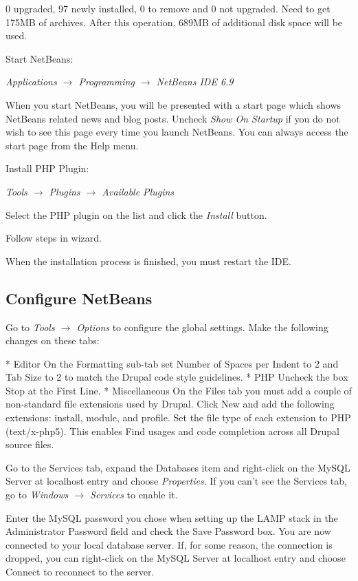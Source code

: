 \documentclass[final,ebook,10pt,twoside,openright]{memoir}
\begin{document}
0 upgraded, 97 newly installed, 0 to remove and 0 not upgraded.
Need to get 175MB of archives.
After this operation, 689MB of additional disk space will be used.

Start NetBeans:

\emph{Applications $\rightarrow$ Programming $\rightarrow$ NetBeans IDE 6.9}

When you start NetBeans, you will be presented with a start page which shows NetBeans related news and blog posts. Uncheck \emph{Show On Startup} if you do not wish to see this page every time you launch NetBeans. You can always access the start page from the Help menu.

Install PHP Plugin:

\emph{Tools $\rightarrow$ Plugins $\rightarrow$ Available Plugins}

Select the PHP plugin on the list and click the \emph{Install} button.

Follow steps in wizard.

When the installation process is finished, you must restart the IDE.

\subsection{Configure NetBeans}

Go to \emph{Tools $\rightarrow$ Options} to configure the global settings. Make the following changes on these tabs:

    * Editor On the Formatting sub-tab set Number of Spaces per Indent to 2 and Tab Size to 2 to match the Drupal code style guidelines.
    * PHP Uncheck the box Stop at the First Line.
    * Miscellaneous On the Files tab you must add a couple of non-standard file extensions used by Drupal. Click New and add the following extensions: install, module, and profile. Set the file type of each extension to PHP (text/x-php5). This enables Find usages and code completion across all Drupal source files.

Go to the Services tab, expand the Databases item and right-click on the MySQL Server at localhost entry and choose \emph{Properties}. If you can’t see the Services tab, go to \emph{Windows $\rightarrow$ Services} to enable it.

Enter the MySQL password you chose when setting up the LAMP stack in the Administrator Password field and check the Save Password box. You are now connected to your local database server. If, for some reason, the connection is dropped, you can right-click on the MySQL Server at localhost entry and choose Connect to reconnect to the server.
\end{document}

